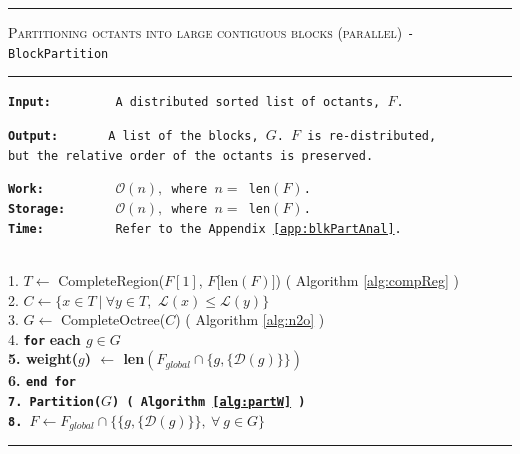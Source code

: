 \begin{table} 
\centering
\rule{\textwidth}{0.01mm}
\begin{algorithm}{ \textsc{Partitioning octants into large contiguous blocks (parallel)} \tt{- BlockPartition}}
\rule{\textwidth}{0.01mm}
\flushleft
\tt{\bf{Input:~~~~~~~~}} A distributed sorted list of octants, $F$.\\
	\begin{tabbing}
  \tt{\bf{Output:~~~~~~}} \= \tt{A list of the blocks, $G$. $F$ is re-distributed,}\\
  \> \tt{but the relative order of the octants is preserved.}
  \end{tabbing}
\tt{\bf{Work:~~~~~~~~~}} $\mathcal{O}(n),$ where $n = $ len$(F)$.\\
\tt{\bf{Storage:~~~~~~}} $\mathcal{O}(n),$ where $n = $ len$(F)$.\\
\tt{\bf{Time:~~~~~~~~~}} Refer to the Appendix \ref{app:blkPartAnal}.\\
~\\
\begin{tabbing}
1. $T \leftarrow$ CompleteRegion($F[1]$, $F[$len$(F)]$) ( Algorithm \ref{alg:compReg} )\\
2. $C \leftarrow \{x \in T ~|~ \forall y \in T,$ $\mathcal{L}(x) \leq \mathcal{L}(y)\}$  \\
3. $G \leftarrow$ CompleteOctree($C$) ( Algorithm \ref{alg:n2o} )\\
4. {\tt \bf for} \= \bf{each} $g \in  G$\\
5.  \> weight($g$) $\leftarrow$ len$\left(F_{global} \cap \{g,\{\mathcal{D}(g)\}\}\right)$\\
6. \tt{\bf{end for}}\\
7. Partition($G$) ( Algorithm \ref{alg:partW} ) \\  
8. $F \leftarrow F_{global} \cap \{\{g,\{\mathcal{D}(g)\}\}, ~\forall ~g \in G\}$ 
\end{tabbing}
\label{alg:blkPart}
\end{algorithm}
\rule{\textwidth}{0.01mm}
\end{table}

